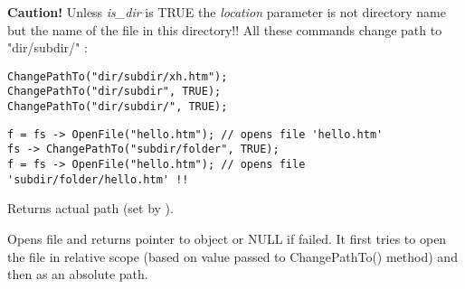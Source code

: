 {\bf Caution! } Unless {\it is\_dir} is TRUE the {\it location} parameter
is not directory name but the name of the file in this directory!! All these
commands change path to "dir/subdir/" :

\begin{verbatim}
ChangePathTo("dir/subdir/xh.htm");
ChangePathTo("dir/subdir", TRUE);
ChangePathTo("dir/subdir/", TRUE);
\end{verbatim}





\begin{verbatim}
f = fs -> OpenFile("hello.htm"); // opens file 'hello.htm'
fs -> ChangePathTo("subdir/folder", TRUE);
f = fs -> OpenFile("hello.htm"); // opens file 'subdir/folder/hello.htm' !!
\end{verbatim}

\label{wxfilesystemgetpath}


Returns actual path (set by ).

\label{wxfilesystemopenfile}


Opens file and returns pointer to  object
or NULL if failed. It first tries to open the file in relative scope
(based on value passed to ChangePathTo() method) and then as an
absolute path.


